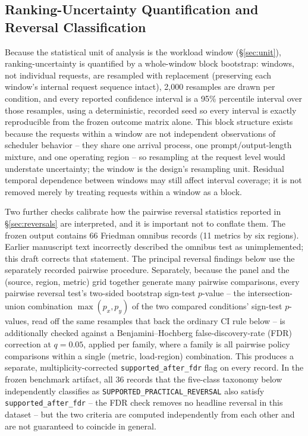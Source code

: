 \subsection{Ranking-Uncertainty Quantification and Reversal Classification}
\label{sec:uncertainty}

Because the statistical unit of analysis is the workload window
(\S\ref{sec:unit}), ranking-uncertainty is quantified by a whole-window
block bootstrap: windows, not individual requests, are resampled with
replacement (preserving each window's internal request sequence intact),
2{,}000 resamples are drawn per condition, and every reported confidence
interval is a 95\% percentile interval over those resamples, using a
deterministic, recorded seed so every interval is exactly reproducible from
the frozen outcome matrix alone. This block structure exists because the
requests within a window are not independent observations of scheduler
behavior -- they share one arrival process, one prompt/output-length
mixture, and one operating region -- so resampling at the request level
would understate uncertainty; the window is the design's resampling unit. Residual temporal dependence between windows may still affect interval coverage; it is not removed merely by treating requests within a window as a block.

Two further checks calibrate how the pairwise reversal statistics reported
in \S\ref{sec:reversals} are interpreted, and it is important not to
conflate them. The frozen output contains 66 Friedman omnibus records (11 metrics by six regions). Earlier manuscript text incorrectly described the omnibus test as unimplemented; this draft corrects that statement. The principal reversal findings below use the separately recorded pairwise procedure.
Separately, because the panel and the (source, region, metric) grid
together generate many pairwise comparisons, every pairwise reversal
test's two-sided bootstrap sign-test $p$-value -- the intersection-union
combination $\max(p_x, p_y)$ of the two compared conditions' sign-test
$p$-values, read off the same resamples that back the ordinary CI rule
below -- is additionally checked against a Benjamini--Hochberg
false-discovery-rate (FDR) correction at $q = 0.05$, applied per family, where a
family is all pairwise policy comparisons within a single (metric,
load-region) combination. This produces a separate, multiplicity-corrected
\texttt{supported\_after\_fdr} flag on every record. In the frozen
benchmark artifact, all $36$ records that the five-class taxonomy below
independently classifies as \texttt{SUPPORTED\_PRACTICAL\_REVERSAL} also
satisfy \texttt{supported\_after\_fdr} -- the FDR check removes no headline
reversal in this dataset -- but the two criteria are computed
independently from each other and are not guaranteed to coincide in
general.


